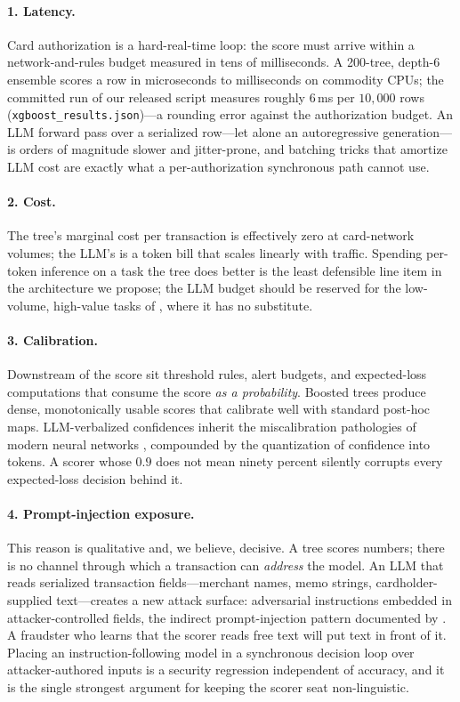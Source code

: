 \paragraph{1. Latency.} Card authorization is a hard-real-time loop: the score
must arrive within a network-and-rules budget measured in tens of
milliseconds. A 200-tree, depth-6 ensemble scores a row in microseconds to
milliseconds on commodity CPUs; the committed run of our released script
measures roughly $6$\,ms per $10{,}000$ rows
(\texttt{xgboost\_results.json})---a rounding error against the authorization
budget. An LLM
forward pass over a serialized row---let alone an autoregressive
generation---is orders of magnitude slower and jitter-prone, and batching
tricks that amortize LLM cost are exactly what a per-authorization
synchronous path cannot use.

\paragraph{2. Cost.} The tree's marginal cost per transaction is effectively
zero at card-network volumes; the LLM's is a token bill that scales linearly
with traffic. Spending per-token inference on a task the tree does better is
the least defensible line item in the architecture we propose; the LLM budget
should be reserved for the low-volume, high-value tasks of
, where it has no substitute.

\paragraph{3. Calibration.} Downstream of the score sit threshold rules, alert
budgets, and expected-loss computations that consume the score \emph{as a
probability}. Boosted trees produce dense, monotonically usable scores that
calibrate well with standard post-hoc maps. LLM-verbalized confidences
inherit the miscalibration pathologies of modern neural networks
\citep{guo2017calibration}, compounded by the quantization of confidence into
tokens. A scorer whose $0.9$ does not mean ninety percent silently corrupts
every expected-loss decision behind it.

\paragraph{4. Prompt-injection exposure.} This reason is qualitative and, we
believe, decisive. A tree scores numbers; there is no channel through which a
transaction can \emph{address} the model. An LLM that reads serialized
transaction fields---merchant names, memo strings, cardholder-supplied
text---creates a new attack surface: adversarial instructions embedded in
attacker-controlled fields, the indirect prompt-injection pattern documented
by \citet{greshake2023injection}. A fraudster who learns that the scorer reads
free text will put text in front of it. Placing an instruction-following model
in a synchronous decision loop over attacker-authored inputs is a security
regression independent of accuracy, and it is the single strongest argument
for keeping the scorer seat non-linguistic.

